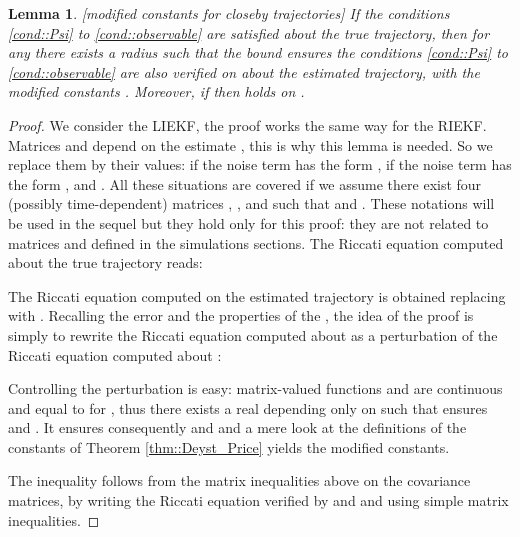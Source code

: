 \documentclass[a4paper,12pt,onecolumn]{article}
\newtheorem{lem}{Lemma}
\begin{document}
\begin{lem}
\label{lem::Riccati} \emph{[modified constants for closeby trajectories]}
If the conditions \eqref{cond::Psi} to \eqref{cond::observable} are satisfied about the \emph{true} trajectory, then for any  there exists a radius  such that the bound  ensures the conditions \eqref{cond::Psi} to \eqref{cond::observable} are also verified on  about the \emph{estimated} trajectory, with the modified constants .  Moreover, if  then  holds on .
\end{lem}

\begin{proof}
We consider the LIEKF, the proof works the same way for the RIEKF. Matrices  and  depend on the estimate , this is why this lemma is needed. So we replace them by their values:  if the noise term has the form ,  if the noise term has the form , and . All these situations are covered if we assume there exist four (possibly time-dependent) matrices , ,  and  such that  and . These notations will be used in the sequel but they hold only for this proof: they are not related to matrices  and  defined in the simulations sections. The Riccati equation computed about the true trajectory reads:

The Riccati equation computed on the estimated trajectory is obtained replacing  with .
Recalling the error  and the properties of the , the idea of the proof is simply to rewrite the Riccati equation computed about  as a perturbation of the Riccati equation computed about :


Controlling the perturbation is easy: matrix-valued functions  and  are continuous and equal to  for , thus there exists a real
 depending only on   such that  ensures  and . It ensures consequently  and  and a mere look at the definitions of the constants of Theorem \ref{thm::Deyst_Price} yields the modified constants.

The inequality  follows from the matrix inequalities above on the covariance matrices, by writing the Riccati equation verified by  and  and using simple matrix inequalities. 

\end{proof}
\end{document}
